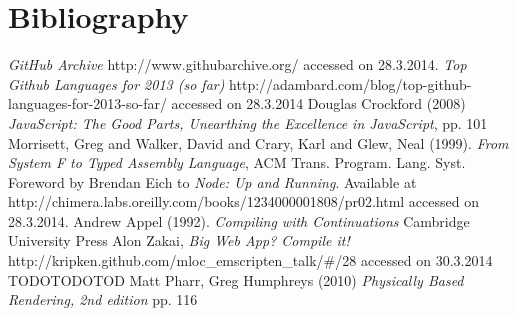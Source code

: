 \documentclass[11pt]{report}
\begin{document}
\chapter{Bibliography}
\begin{thebibliography}{1}
     {\em GitHub Archive} http://www.githubarchive.org/ accessed on 28.3.2014.
     {\em Top Github Languages for 2013 (so far)} http://adambard.com/blog/top-github-languages-for-2013-so-far/ accessed on 28.3.2014
     Douglas Crockford (2008) {\em JavaScript: The Good Parts, Unearthing the Excellence in JavaScript}, pp. 101
     Morrisett, Greg and Walker, David and Crary, Karl and Glew, Neal (1999). {\em From System F to Typed Assembly Language}, ACM Trans. Program. Lang. Syst.
     Foreword by Brendan Eich to {\em Node: Up and Running}. Available at http://chimera.labs.oreilly.com/books/1234000001808/pr02.html accessed on 28.3.2014.
     Andrew Appel (1992). {\em Compiling with Continuations} Cambridge University Press
     Alon Zakai, {\em Big Web App? Compile it!} http://kripken.github.com/mloc_emscripten_talk/\#/28 accessed on 30.3.2014
     TODOTODOTOD
     Matt Pharr, Greg Humphreys (2010) {\em Physically Based Rendering, 2nd edition} pp. 116
\end{thebibliography}
\end{document}
